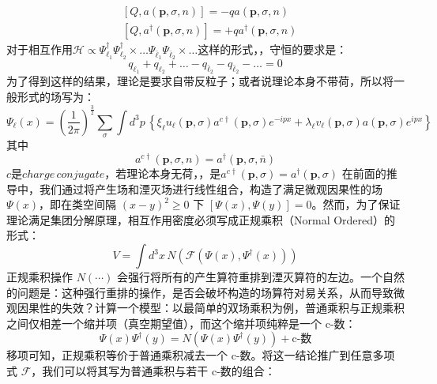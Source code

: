 \begin{subequations}
    \begin{align}
        &[Q,a(\boldsymbol{p},\sigma,n)]=-qa(\boldsymbol{p},\sigma,n)\\
        &[Q,a^\dagger(\boldsymbol{p},\sigma,n)]=+qa^\dagger(\boldsymbol{p},\sigma,n)
    \end{align}
\end{subequations}
对于相互作用$\mathscr{H}\propto \Psi^\dagger_{\ell_1}\Psi^\dagger_{\ell_2}\times\dots\Psi_{\bar{\ell}_1}\Psi_{\bar{\ell}_2}\times\dots$这样的形式，，守恒的要求是：
\begin{equation}
    q_{\ell_1}+q_{\ell_2}+\dots-q_{\bar{\ell}_2}-q_{\bar{\ell}_2}-\dots=0
\end{equation}
为了得到这样的结果，\color{blue}理论是要求自带反粒子；或者说理论本身不带荷\normalcolor，所以将一般形式的场写为：\begin{equation}
    \Psi_\ell(x) =(\frac{1}{2\pi})^\frac{3}{2}\sum_{\sigma}\int d^3p \, \left\{\xi_\ell u_\ell(\boldsymbol{p},\sigma)a^{c\dagger}(\mathbf{p},\sigma) e^{-ipx} + \lambda_\ell v_\ell(\boldsymbol{p},\sigma) a(\mathbf{p},\sigma)e^{ipx} \right\}
\end{equation}
其中
\begin{equation}
    a^{c\dagger}(\mathbf{p},\sigma,n)=a^{\dagger}(\mathbf{p},\sigma,\bar{n})
\end{equation}
$c$是$charge \,conjugate$，若理论本身无荷，，是$a^{c\dagger}(\mathbf{p},\sigma)=a^{\dagger}(\mathbf{p},\sigma)$
\topictitle{***}
在前面的推导中，我们通过将产生场和湮灭场进行线性组合，构造了满足微观因果性的场 $\Psi(x)$，即在类空间隔 $(x-y)^2 \ge 0$ 下 $[\Psi(x), \Psi(y)] = 0$。然而，为了保证理论满足集团分解原理，相互作用密度必须写成正规乘积（Normal Ordered）的形式：
\begin{equation}
    V = \int d^3x \, N\!\left( \mathscr{F}(\Psi(x), \Psi^\dagger(x)) \right)
\end{equation}
正规乘积操作 $N(\cdots)$ 会强行将所有的产生算符重排到湮灭算符的左边。一个自然的问题是：这种强行重排的操作，是否会破坏构造的场算符对易关系，从而导致微观因果性的失效？计算一个模型：以最简单的双场乘积为例，普通乘积与正规乘积之间仅相差一个缩并项（真空期望值），而这个缩并项纯粹是一个 c-数：
\begin{equation*}
    \Psi(x)\Psi^\dagger(y) = N\!\left( \Psi(x)\Psi^\dagger(y) \right) + \text{c-数}
\end{equation*}
移项可知，正规乘积等价于普通乘积减去一个 c-数。将这一结论推广到任意多项式 $\mathscr{F}$，我们可以将其写为普通乘积与若干 c-数的组合：
